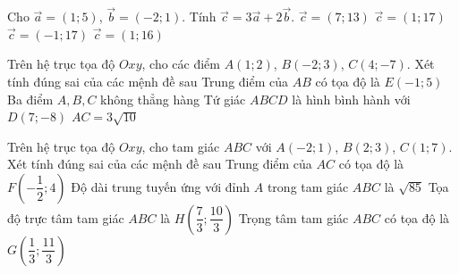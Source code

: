 \begin{ex}%
	Cho $\overrightarrow{a}=(1; 5)$,  $\overrightarrow{b}=(-2; 1)$. Tính $\overrightarrow{c}=3\overrightarrow{a}+2\overrightarrow{b}$.
	\choice 
		{$\overrightarrow{c}=(7;  13)$}
		 {$\overrightarrow{c}=(1; 17)$}
		{\True $\overrightarrow{c}=(-1;  17)$}
		{$\overrightarrow{c}=(1;  16)$}
\end{ex}



\begin{ex}%
	Trên hệ trục tọa độ $Oxy$, cho các  điểm $A(1;2)$, $B(-2;3)$, $C(4;-7)$. Xét tính đúng sai của các mệnh đề sau
	\choiceTF 
		{Trung điểm của  $AB$ có tọa độ là $E(-1;5)$}
		 {\True Ba điểm $A,B,C$ không thẳng hàng}
		{\True Tứ giác $ABCD$ là  hình bình hành với $D(7;-8)$}
		{\True  ${AC}=3\sqrt{10}$}
\end{ex}

\begin{ex}%
	Trên hệ trục tọa  độ $Oxy$, cho tam giác $ABC$ với $A(-2;1)$, $B(2;3)$, $C(1;7)$. Xét tính đúng sai của các mệnh đề sau
	\choiceTF 
		{\True Trung điểm của  $AC$ có tọa độ là $F\left(-\dfrac{1}{2};4 \right) $}
		{ Độ dài trung tuyến  ứng với đỉnh $A$ trong tam giác $ABC$ là $\sqrt{85}$}
		{  Tọa độ trực tâm tam giác $ABC$ là $H\left(\dfrac{7}{3};\dfrac{10}{3} \right)$ }
		{\True Trọng tâm tam giác $ABC$ có tọa độ là  $G\left(\dfrac{1}{3};\dfrac{11}{3} \right)$ }
\end{ex}


